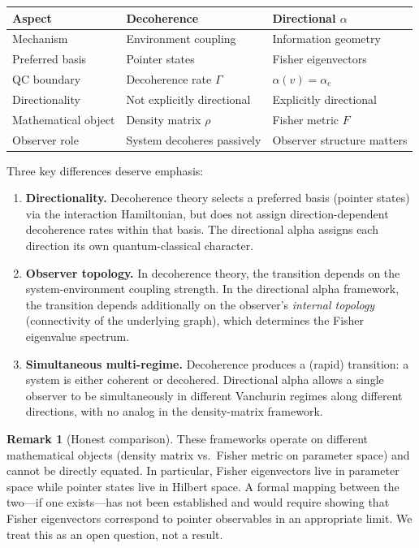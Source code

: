 \documentclass[11pt,a4paper]{article}
\theoremstyle{plain}
\theoremstyle{definition}
\newtheorem{remark}[theorem]{Remark}
\newcommand{\alphac}{\alpha_{\mathrm{c}}}
\begin{document}
\begin{center}
\begin{tabular}{lll}
\hline
\textbf{Aspect} & \textbf{Decoherence} & \textbf{Directional $\alpha$} \\
\hline
Mechanism & Environment coupling & Information geometry \\
Preferred basis & Pointer states & Fisher eigenvectors \\
QC boundary & Decoherence rate $\Gamma$ & $\alpha(v) = \alphac$ \\
Directionality & Not explicitly directional & Explicitly directional \\
Mathematical object & Density matrix $\rho$ & Fisher metric $F$ \\
Observer role & System decoheres passively & Observer structure matters \\
\hline
\end{tabular}
\end{center}

Three key differences deserve emphasis:

\begin{enumerate}[noitemsep]
\item \textbf{Directionality.}  Decoherence theory selects a
  preferred basis (pointer states) via the interaction Hamiltonian,
  but does not assign direction-dependent decoherence rates
  within that basis.  The directional alpha assigns each direction
  its own quantum-classical character.

\item \textbf{Observer topology.}  In decoherence theory, the
  transition depends on the system-environment coupling strength.
  In the directional alpha framework, the transition depends
  additionally on the observer's \emph{internal topology}
  (connectivity of the underlying graph), which determines the
  Fisher eigenvalue spectrum.

\item \textbf{Simultaneous multi-regime.}  Decoherence produces a
  (rapid) transition: a system is either coherent or decohered.
  Directional alpha allows a single observer to be simultaneously
  in different Vanchurin regimes along different directions, with
  no analog in the density-matrix framework.
\end{enumerate}

\begin{remark}[Honest comparison]
These frameworks operate on different mathematical objects
(density matrix vs.\ Fisher metric on parameter space) and
cannot be directly equated.  In particular, Fisher eigenvectors
live in parameter space while pointer states live in Hilbert
space.  A formal mapping between the two---if one exists---has
not been established and would require showing that Fisher
eigenvectors correspond to pointer observables in an appropriate
limit.  We treat this as an open question, not a result.
\end{remark}
\end{document}

